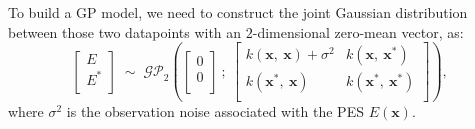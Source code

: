 To build a GP model, we need to construct the joint Gaussian distribution between those two datapoints with an $2$-dimensional zero-mean vector, as:
\begin{equation}
    \label{equ:2.33}
         \begin{bmatrix}
         E\\
         E^{*}\\
         \end{bmatrix}
        \;\mathtt{\sim}\;
        \mathcal{GP}_{2}\left(
        \begin{bmatrix}
         0\\
         0\\
         \end{bmatrix}\:
         ;\:\begin{bmatrix}
             k(\mathbf{x},\:\mathbf{x})+\sigma^{2} & k(\mathbf{x},\:\mathbf{x}^{*})\\
             k(\mathbf{x}^{*},\:\mathbf{x}) & k(\mathbf{x}^{*},\:\mathbf{x}^{*})\\
         \end{bmatrix}\right),
\end{equation}  
where $\sigma^{2}$ is the observation noise associated with the PES $E(\mathbf{x})$.


